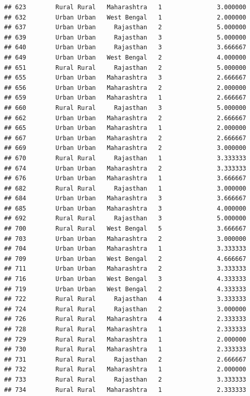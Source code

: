 \documentclass[
]{article}
\begin{document}
\begin{verbatim}
## 623        Rural Rural   Maharashtra   1               3.000000
## 632        Urban Urban   West Bengal   1               2.000000
## 637        Urban Urban     Rajasthan   2               5.000000
## 639        Urban Urban     Rajasthan   3               5.000000
## 640        Urban Urban     Rajasthan   3               3.666667
## 649        Urban Urban   West Bengal   2               4.000000
## 651        Rural Rural     Rajasthan   2               5.000000
## 655        Urban Urban   Maharashtra   3               2.666667
## 656        Urban Urban   Maharashtra   2               2.000000
## 659        Urban Urban   Maharashtra   1               2.666667
## 660        Rural Rural     Rajasthan   3               5.000000
## 662        Urban Urban   Maharashtra   2               2.666667
## 665        Urban Urban   Maharashtra   1               2.000000
## 667        Urban Urban   Maharashtra   2               2.666667
## 669        Urban Urban   Maharashtra   2               3.000000
## 670        Rural Rural     Rajasthan   1               3.333333
## 674        Urban Urban   Maharashtra   2               3.333333
## 676        Urban Urban   Maharashtra   1               3.666667
## 682        Rural Rural     Rajasthan   1               3.000000
## 684        Urban Urban   Maharashtra   3               3.666667
## 685        Urban Urban   Maharashtra   3               4.000000
## 692        Rural Rural     Rajasthan   3               5.000000
## 700        Rural Rural   West Bengal   5               3.666667
## 703        Urban Urban   Maharashtra   2               3.000000
## 704        Urban Urban   Maharashtra   1               3.333333
## 709        Urban Urban   West Bengal   2               4.666667
## 711        Urban Urban   Maharashtra   2               3.333333
## 716        Urban Urban   West Bengal   3               4.333333
## 719        Urban Urban   West Bengal   2               4.333333
## 722        Rural Rural     Rajasthan   4               3.333333
## 724        Rural Rural     Rajasthan   2               3.000000
## 726        Rural Rural   Maharashtra   4               2.333333
## 728        Rural Rural   Maharashtra   1               2.333333
## 729        Rural Rural   Maharashtra   1               2.000000
## 730        Rural Rural   Maharashtra   1               2.333333
## 731        Rural Rural     Rajasthan   2               2.666667
## 732        Rural Rural   Maharashtra   1               2.000000
## 733        Rural Rural     Rajasthan   2               3.333333
## 734        Rural Rural   Maharashtra   1               2.333333

\end{verbatim}
\end{document}
